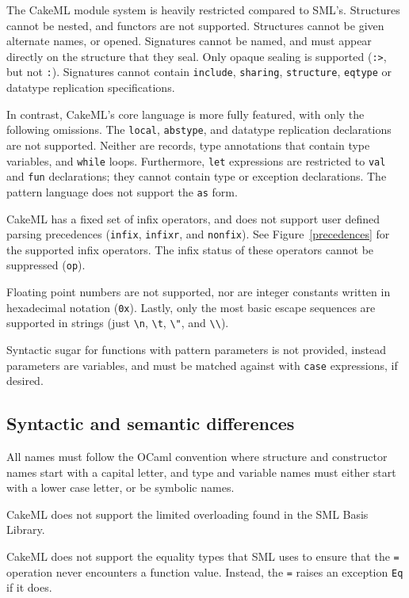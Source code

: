 \documentclass[12pt,a4paper]{book}
\begin{document}
The CakeML module system is heavily restricted compared to SML's. Structures cannot be nested, and functors are not supported. Structures cannot be given alternate names, or opened. Signatures cannot be named, and must appear directly on the structure that they seal. Only opaque sealing is supported (\texttt{:>}, but not \texttt{:}). Signatures cannot contain \texttt{include}, \texttt{sharing}, \texttt{structure}, \texttt{eqtype} or datatype replication specifications.

In contrast, CakeML's core language is more fully featured, with only the following omissions. The \texttt{local}, \texttt{abstype}, and datatype replication declarations are not supported. Neither are records, type annotations that contain type variables, and \texttt{while} loops. Furthermore, \texttt{let} expressions are restricted to \texttt{val} and \texttt{fun} declarations; they cannot contain type or exception declarations. The pattern language does not support the \texttt{as} form.

CakeML has a fixed set of infix operators, and does not support user defined parsing precedences (\texttt{infix}, \texttt{infixr}, and \texttt{nonfix}). See Figure~\ref{precedences} for the supported infix operators. The infix status of these operators cannot be suppressed (\texttt{op}).

Floating point numbers are not supported, nor are integer constants written in hexadecimal notation (\texttt{0x}). Lastly, only the most basic escape sequences are supported in strings (just \texttt{\textbackslash n}, \texttt{\textbackslash t}, \texttt{\textbackslash "}, and \texttt{\textbackslash\textbackslash}).

Syntactic sugar for functions with pattern parameters is not provided, instead parameters are variables, and must be matched against with \texttt{case} expressions, if desired.

\subsection{Syntactic and semantic differences}

All names must follow the OCaml convention where structure and constructor names start with a capital letter, and type and variable names must either start with a lower case letter, or be symbolic names.

CakeML does not support the limited overloading found in the SML Basis Library.

CakeML does not support the equality types that SML uses to ensure that the \texttt{=} operation never encounters a function value. Instead, the \texttt{=} raises an exception \texttt{Eq} if it does.
\end{document}

